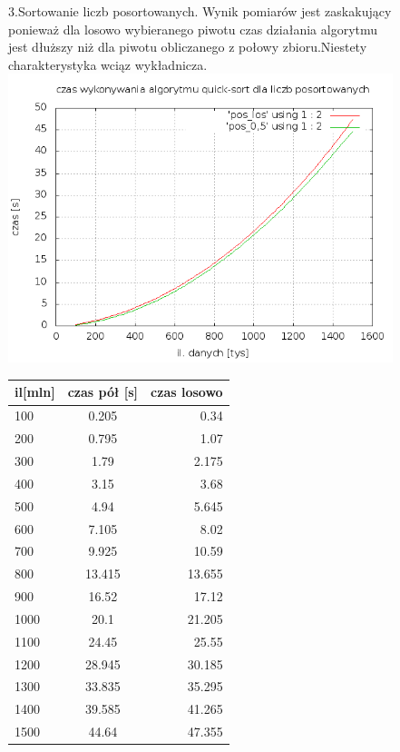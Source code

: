 \documentclass[a4paper,11pt]{report}
\begin{document}
\begin{figure}

  \begin{center}
 
  3.Sortowanie liczb posortowanych. Wynik pomiarów jest zaskakujący ponieważ dla losowo wybieranego piwotu czas działania algorytmu jest dłuższy niż dla piwotu obliczanego z połowy zbioru.Niestety charakterystyka wciąz wykładnicza.
    \includegraphics[scale=0.5]{./czas_posortowane.png}
    \label{fig:}
    \caption{}
       \begin{tabular}{|l|c|r|}
\hline
il[mln] & czas pół [s] & czas losowo \\
\hline
100 & 0.205& 0.34\\
200  & 0.795& 1.07\\
300  & 1.79& 2.175\\
400  & 3.15&  3.68\\
500  & 4.94&  5.645\\
600  & 7.105& 8.02\\
700  & 9.925& 10.59\\
800  & 13.415& 13.655\\
900  & 16.52&  17.12\\
1000  & 20.1& 21.205\\
1100  & 24.45& 25.55\\
1200  & 28.945& 30.185\\
1300  & 33.835&  35.295\\
1400  & 39.585& 41.265\\
1500  & 44.64& 47.355\\

\hline
\end{tabular}
\newline
  \end{center}
\end{figure}
\end{document}
